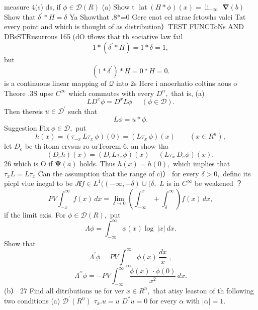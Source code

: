 measure 4(s) ds, if $\phi\in{\mathcal{D}}(R)$ (a) Show t $\operatorname{lat}\left(H*\phi\right)(x)=\operatorname{li}_{-\infty}$ $\mathbf{\nabla}(b)$ Show that $\delta^{\prime}\ast H=\delta$ Ya Showthat .8*=0 Gere enot ecl ntrae fctowhs valei Tat every point and which is thought of as distribution）TEST FUNCToNs AND DBsSTRusurrous 165 (dO tflows that th sociative law fail $$ 1*(\delta^{\prime}*H)=1*\delta=1, $$ but $$ (1\ast\delta^{\prime})\ast H=0\ast H=0. $$ is a continuous linear mapping of $\mathcal{Q}$ into 2s Here i anoerhatio coltins aous o Theore .3S upse $C^{\infty}$ which commutes with every $D^{\alpha},$ that is, (a) $$ L D^{x}\phi=D^{x}L\phi~~~~~~(\phi\in\mathcal{D}). $$ Then thereis $u\in{\mathcal{D}}^{\prime}$ such that $$ L\phi=u*\phi. $$ Suggestion ${\mathrm{Fix}}\ \phi\in{\mathcal{D}},$ put $$ h(x)=(\tau_{-x}\,L\tau_{x}\,\phi)(0)=(L\tau_{x}\,\phi)(x)\qquad(x\in R^{n}), $$ let $D_{e}$ be th itona ervsus ro orTeorem 6. an show tha $$ (D_{e}h)(x)=(D_{e}L\tau_{x}\phi)(x)-(L\tau_{x}\,D_{e}\phi)(x), $$ 26 which is O if $\mathbf{\Psi}(a)$ holds. Thus $h(x)=h(0),$ which implies that $\tau_{x}L=L\tau_{x}$ Can the assumption that the range of c)） for every $\delta>0,$ definc its picpl vlue inegal to be $J\mathbf{f}f\in L^{1}((-\infty,-\delta)\cup(\delta,$ $\boldsymbol{\mathit{L}}$ is in $C^{\infty}$ be weakened ？ $$ P V\int_{-x}^{\infty}f(x)\,d x=\operatorname*{lim}_{\delta\to0}\left(\int_{-\infty}^{x}+\int_{\delta}^{\infty}\right)f(x)\,d x, $$ if thc limit exis. For $\phi\in{\mathcal{D}}(R),$ put $$ \Lambda\phi=\int_{-\infty}^{\infty}\phi(x)\log\ |x|\ d x. $$ Show that $$ \Lambda^{\prime}\phi=P V\int_{-\infty}^{\infty}\phi(x)\,{\frac{d x}{x}}\;, $$ $$ \Lambda^{\prime\prime}\phi=-P V\int_{-\infty}^{\infty}\frac{\phi(x)\,\cdot\phi(0)}{x^{2}}\,d x. $$ (b） 27 Find all ditributions ue for ver $x\in R^{n},$ that atisy leaston of th following two conditions (a) ${\mathcal{D}}^{\prime}(R^{n})$ $\tau_{x}.u=u$ $D^{*}u=0$ for every $\textstyle\alpha$ with $|\alpha|=1.$